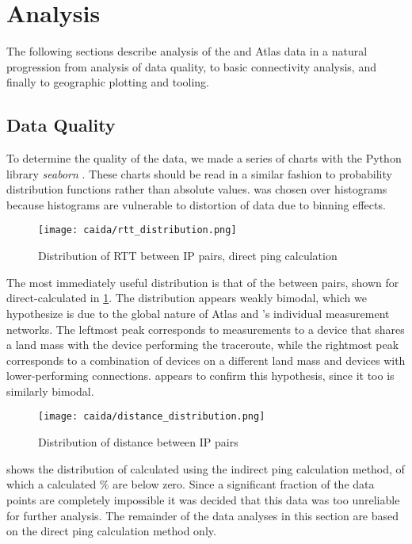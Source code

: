 \section{Analysis}\label{sec:caida_results}

The following sections describe analysis of the \caida and \ripe Atlas data in a natural progression from analysis of data quality, to basic connectivity analysis, and finally to geographic plotting and \gis tooling.

\subsection{Data Quality}\label{sec:caida_data_quality}

To determine the quality of the data, we made a series of \kde charts with the Python library \textit{seaborn} \cite{seaborn}. These charts should be read in a similar fashion to probability distribution functions rather than absolute values. \KDE was chosen over histograms because histograms are vulnerable to distortion of data due to binning effects.

\begin{figure}[h]
    \centering
    \texttt{[image: caida/rtt\_distribution.png]}
    \caption{Distribution of RTT between IP pairs, direct ping calculation}
    \label{fig:caida_rtt_distribution}
\end{figure}

The most immediately useful distribution is that of the \rtt between \ip pairs, shown for direct-calculated \rtts in \cref{fig:caida_rtt_distribution}. The distribution appears weakly bimodal, which we hypothesize is due to the global nature of \ripe Atlas and \caida's individual measurement networks. The leftmost peak corresponds to measurements to a device that shares a land mass with the device performing the traceroute, while the rightmost peak corresponds to a combination of devices on a different land mass and devices with lower-performing connections.  appears to confirm this hypothesis, since it too is similarly bimodal.

\begin{figure}[h]
    \centering
    \texttt{[image: caida/distance\_distribution.png]}
    \caption{Distribution of distance between IP pairs}
    \label{fig:caida_distance_distribution}
\end{figure}

  shows the distribution of \rtts calculated using the indirect ping calculation method, of which a calculated \% are below zero. Since a significant fraction of the data points are completely impossible it was decided that this data was too unreliable for further analysis. The remainder of the data analyses in this section are based on the direct ping calculation method only.

